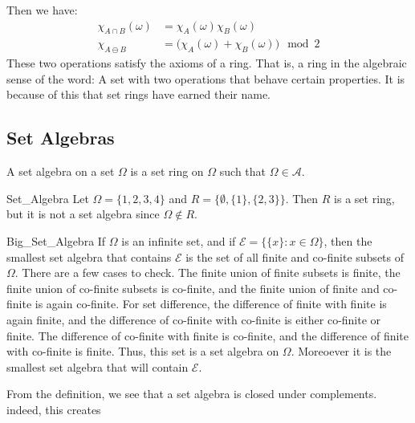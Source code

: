         Then we have:
        \begin{align}
            \chi_{A\cap{B}}(\omega)
            &=\chi_{A}(\omega)\chi_{B}(\omega)\\
            \chi_{A\ominus{B}}&=
            \big(\chi_{A}(\omega)+\chi_{B}(\omega)\big)
            \mod{2}
        \end{align}
        These two operations satisfy the axioms of a ring.
        That is, a ring in the algebraic sense of the word:
        A set with two operations that behave certain
        properties. It is because of this that set rings
        have earned their name.
    \subsection{Set Algebras}
        \begin{definition}
            A set algebra on a set $\Omega$ is a set ring
            on $\Omega$ such that $\Omega\in\mathcal{A}$.
        \end{definition}
        \begin{lexample}{}{Set_Algebra}
            Let $\Omega=\{1,2,3,4\}$ and
            $R=\{\emptyset,\{1\},\{2,3\}\}$. Then $R$
            is a set ring, but it is not a set algebra
            since $\Omega\notin{R}$.
        \end{lexample}
        \begin{lexample}{}{Big_Set_Algebra}
            If $\Omega$ is an infinite set, and if
            $\mathcal{E}=\big\{\{x\}:x\in\Omega\big\}$, then
            the smallest set algebra that contains $\mathcal{E}$
            is the set of all finite and co-finite subsets of
            $\Omega$. There are a few cases to check. The finite
            union of finite subsets is finite, the finite union of
            co-finite subsets is co-finite, and the finite union
            of finite and co-finite is again co-finite. For set
            difference, the difference of finite with finite is
            again finite, and the difference of co-finite with
            co-finite is either co-finite or finite. The
            difference of co-finite with finite is co-finite,
            and the difference of finite with co-finite is finite.
            Thus, this set is a set algebra on $\Omega$. Moreoever
            it is the smallest set algebra that will contain $\mathcal{E}$.
        \end{lexample}
        From the definition, we see that a set algebra
        is closed under complements. indeed, this creates
